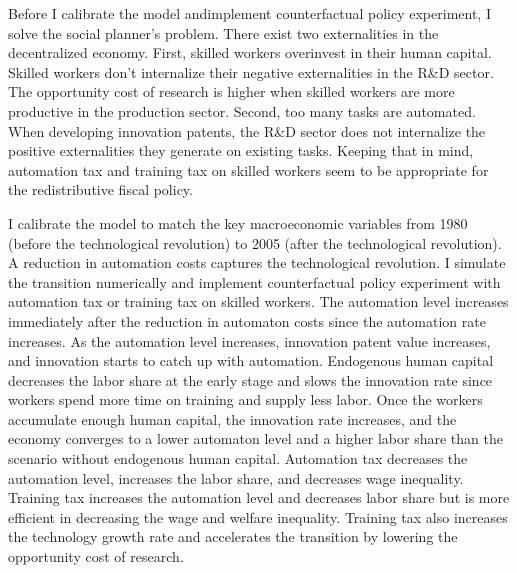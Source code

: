 \documentclass[12pt]{article}
\begin{document}
Before I calibrate the model andimplement counterfactual policy experiment, I solve the social planner's problem. There exist two externalities in the decentralized economy. First, skilled workers overinvest in their human capital. Skilled workers don't internalize their negative externalities in the R\&D sector. The opportunity cost of research is higher when skilled workers are more productive in the production sector. Second, too many tasks are automated. When developing innovation patents, the R\&D sector does not internalize the positive externalities they generate on existing tasks. Keeping that in mind, automation tax and training tax on skilled workers seem to be appropriate for the redistributive fiscal policy. 

I calibrate the model to match the key macroeconomic variables from 1980 (before the technological revolution) to 2005 (after the technological revolution). A reduction in automation costs captures the technological revolution. I simulate the transition numerically and implement counterfactual policy experiment with automation tax or training tax on skilled workers. The automation level increases immediately after the reduction in automaton costs since the automation rate increases. As the automation level increases, innovation patent value increases, and innovation starts to catch up with automation. Endogenous human capital decreases the labor share at the early stage and slows the innovation rate since workers spend more time on training and supply less labor. Once the workers accumulate enough human capital, the innovation rate increases, and the economy converges to a lower automaton level and a higher labor share than the scenario without endogenous human capital. Automation tax decreases the automation level, increases the labor share, and decreases wage inequality. Training tax increases the automation level and decreases labor share but is more efficient in decreasing the wage and welfare inequality. Training tax also increases the technology growth rate and accelerates the transition by lowering the opportunity cost of research. 
\end{document}
